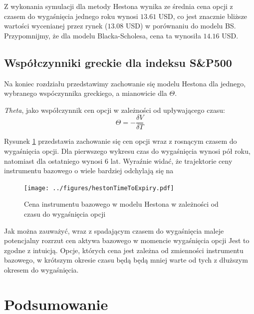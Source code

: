 \documentclass{pracamgr}
\begin{document}
{Z wykonania symulacji dla metody Hestona wynika ze średnia cena opcji z czasem do wygaśnięcia jednego roku wynosi $13.61$ USD, 
co jest znacznie bliższe wartości wycenianej przez rynek ($13.08$ USD) w porównaniu do modelu BS. 
Przypomnijmy, że dla modelu Blacka-Scholesa, cena ta wynosiła $14.16$ USD.



\section{Współczynniki greckie dla indeksu S\&P500}


Na koniec rozdziału przedstawimy zachowanie się modelu Hestona dla jednego, wybranego wspóczynnika greckiego, 
a mianowicie dla $\Theta$.

\textit{Theta}, jako współczynnik cen opcji w zależności od upływającego czasu:
\begin{equation}
  \Theta = - \frac{\delta V}{\delta T}
\end{equation}

Rysunek \ref{fig:hestonTimeToExpiry} przedstawia zachowanie się cen opcji wraz z rosnącym czasem do 
wygaśnięcia opcji. Dla pierwszego wykresu czas do wygaśnięcia wynosi pół roku, natomiast dla ostatniego 
wynosi 6 lat. Wyraźnie widać, że trajektorie ceny instrumentu bazowego o wiele bardziej odchylają się 
na 
\begin{figure}
  \texttt{[image: ../figures/hestonTimeToExpiry.pdf]}
  \caption{Cena instrumentu bazowego w modelu Hestona w zależności od czasu do wygaśnięcia opcji}
  \label{fig:hestonTimeToExpiry}
\end{figure}

Jak można zauważyć, wraz z spadającym czasem do wygaśnięcia maleje potencjalny rozrzut cen aktywa bazowego w momencie wygaśnięcia opcji
Jest to zgodne z intuicją. Opcje, których cena jest zależna od zmienności instrumentu bazowego, 
w krótszym okresie czasu będą będą mniej warte od tych z dłuższym okresem do wygaśnięcia.


\cleardoublepage
{}
\chapter*{Podsumowanie}\label{r:ending}
 

}
\end{document}
